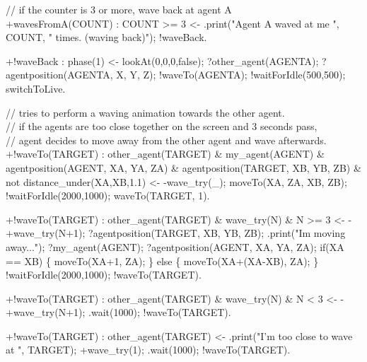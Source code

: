 \documentclass[draft,final]{vutinfth} %
\begin{document}
{// if the counter is 3 or more, wave back at agent A\\
+wavesFromA(COUNT) : COUNT >= 3
                    <-  .print("Agent A waved at me ", COUNT, " times. (waving back)");
                        !waveBack.

+!waveBack : phase(1)
                    <-  lookAt(0,0,0,false);
                        ?other\_agent(AGENTA);
                        ?agentposition(AGENTA, X, Y, Z);
                        !waveTo(AGENTA);
                        !waitForIdle(500,500);
                        switchToLive.

// tries to perform a waving animation towards the other agent.\\
// if the agents are too close together on the screen and 3 seconds pass,\\
// agent decides to move away from the other agent and wave afterwards.\\
+!waveTo(TARGET) :  other\_agent(TARGET) \&
                    my\_agent(AGENT) \&
                    agentposition(AGENT, XA, YA, ZA) \&
                    agentposition(TARGET, XB, YB, ZB) \&
                    not distance\_under(XA,XB,1.1)
                    <-  -wave\_try(\_);
                        moveTo(XA, ZA, XB, ZB); 
                        !waitForIdle(2000,1000);
                        waveTo(TARGET, 1).

+!waveTo(TARGET) :  other\_agent(TARGET) \& wave\_try(N) \& N >= 3
                    <-  -+wave\_try(N+1);
                        ?agentposition(TARGET, XB, YB, ZB);
                        .print("Im moving away...");
                        ?my\_agent(AGENT);
                        ?agentposition(AGENT, XA, YA, ZA);
                        if(XA == XB)
                        \{
                            moveTo(XA+1, ZA);    
                        \}
                        else
                        \{
                            moveTo(XA+(XA-XB), ZA);  
                        \}
                        !waitForIdle(2000,1000);
                        !waveTo(TARGET).

+!waveTo(TARGET) :  other\_agent(TARGET) \& wave\_try(N) \& N < 3
                    <-  -+wave\_try(N+1);
                        .wait(1000);
                        !waveTo(TARGET).

+!waveTo(TARGET) :  other\_agent(TARGET)
                    <-  .print("I'm too close to wave at ", TARGET);
                        +wave\_try(1);
                        .wait(1000);
                        !waveTo(TARGET).

}
\end{document}

